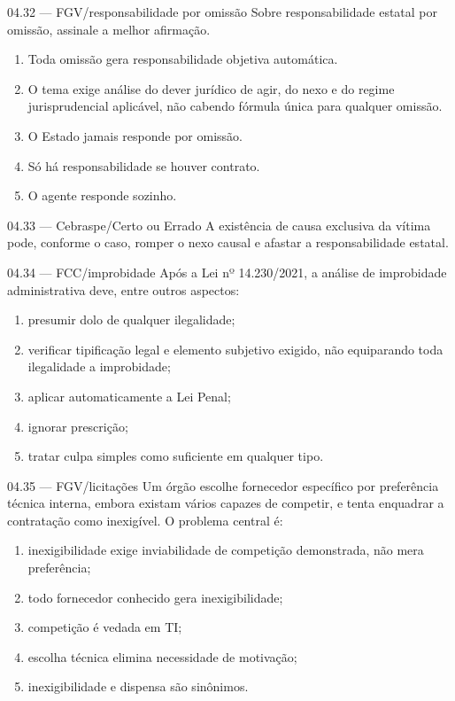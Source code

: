 \begin{questao}{ 04.32 — FGV/responsabilidade por omissão}
Sobre responsabilidade estatal por omissão, assinale a melhor afirmação.
\begin{enumerate}[label=\Alph*)]
\item Toda omissão gera responsabilidade objetiva automática.
\item O tema exige análise do dever jurídico de agir, do nexo e do regime jurisprudencial aplicável, não cabendo fórmula única para qualquer omissão.
\item O Estado jamais responde por omissão.
\item Só há responsabilidade se houver contrato.
\item O agente responde sozinho.
\end{enumerate}
\end{questao}

\begin{questao}{ 04.33 — Cebraspe/Certo ou Errado}
A existência de causa exclusiva da vítima pode, conforme o caso, romper o nexo causal e afastar a responsabilidade estatal.
\end{questao}

\begin{questao}{ 04.34 — FCC/improbidade}
Após a Lei nº 14.230/2021, a análise de improbidade administrativa deve, entre outros aspectos:
\begin{enumerate}[label=\Alph*)]
\item presumir dolo de qualquer ilegalidade;
\item verificar tipificação legal e elemento subjetivo exigido, não equiparando toda ilegalidade a improbidade;
\item aplicar automaticamente a Lei Penal;
\item ignorar prescrição;
\item tratar culpa simples como suficiente em qualquer tipo.
\end{enumerate}
\end{questao}

\begin{questao}{ 04.35 — FGV/licitações}
Um órgão escolhe fornecedor específico por preferência técnica interna, embora existam vários capazes de competir, e tenta enquadrar a contratação como inexigível. O problema central é:
\begin{enumerate}[label=\Alph*)]
\item inexigibilidade exige inviabilidade de competição demonstrada, não mera preferência;
\item todo fornecedor conhecido gera inexigibilidade;
\item competição é vedada em TI;
\item escolha técnica elimina necessidade de motivação;
\item inexigibilidade e dispensa são sinônimos.
\end{enumerate}
\end{questao}

